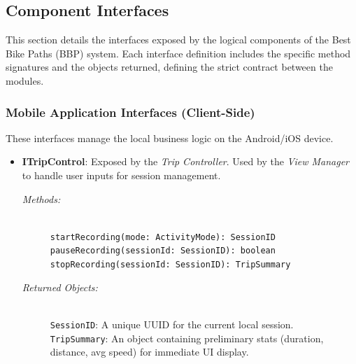 \subsection{Component Interfaces}
This section details the interfaces exposed by the logical components of the Best Bike Paths (BBP) system. Each interface definition includes the specific method signatures and the objects returned, defining the strict contract between the modules.

\subsubsection{Mobile Application Interfaces (Client-Side)}
These interfaces manage the local business logic on the Android/iOS device.

\begin{itemize}
    \item \begin{minipage}[t]{\linewidth}
        \textbf{ITripControl}: Exposed by the \textit{Trip Controller}. Used by the \textit{View Manager} to handle user inputs for session management.
        \begin{description}
            \item[\textit{Methods:}] \hfill \\
            \texttt{startRecording(mode: ActivityMode): SessionID} \\
            \texttt{pauseRecording(sessionId: SessionID): boolean} \\
            \texttt{stopRecording(sessionId: SessionID): TripSummary}
            \item[\textit{Returned Objects:}] \hfill \\
            \texttt{SessionID}: A unique UUID for the current local session. \\
            \texttt{TripSummary}: An object containing preliminary stats (duration, distance, avg speed) for immediate UI display.
        \end{description}
    \end{minipage}
    \vspace{0.3cm}


\end{itemize}
